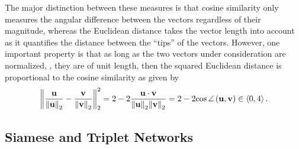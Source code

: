 The major distinction between these measures is that cosine similarity only measures the angular difference between the vectors regardless of their magnitude, whereas the Euclidean distance takes the vector length into account as it quantifies the distance between the ``tips'' of the vectors. However, one important property is that as long as the two vectors under consideration are normalized, \ietext{}, they are of unit length, then the squared Euclidean distance is proportional to the cosine similarity as given by
\begin{equation}
    \label{eq:CosineEuclideanRelation}
    \begin{aligned}
        {\left\Vert {
            \frac{\mathbf{u}}{{\left\Vert {\mathbf{u}} \right\Vert}_2} -
            \frac{\mathbf{v}}{{\left\Vert {\mathbf{v}} \right\Vert}_2}
        } \right\Vert}_2^2 =
        2 -
        2 \frac{
            \mathbf{u} \cdot \mathbf{v}
        }{
            {\left\Vert {\mathbf{u}} \right\Vert}_2 {\left\Vert {\mathbf{v}} \right\Vert}_2
        } =
        2 - 2 {\cos \angle} \left( \mathbf{u}, \mathbf{v} \right)
        \in \left< 0, 4 \right>.
    \end{aligned}
\end{equation}

\subsection{Siamese and Triplet Networks}
\label{ssec:SiameseAndTripletNetworks}

